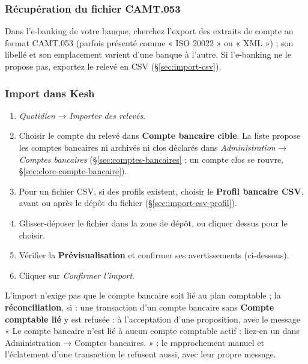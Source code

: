 \documentclass[a4paper,11pt,oneside]{article}
\begin{document}
\subsubsection{Récupération du fichier CAMT.053}

\begin{sloppypar}
Dans l'e-banking de votre banque, cherchez l'export des extraits de compte au format CAMT.053
(parfois présenté comme « ISO 20022 » ou « XML ») ; son libellé et son emplacement varient d'une
banque à l'autre. Si l'e-banking ne le propose pas, exportez le relevé en CSV
(\S\ref{sec:import-csv}).
\end{sloppypar}

\subsubsection{Import dans Kesh}\label{sec:import-dans-kesh}

\begin{enumerate}
    \item \emph{Quotidien} → \emph{Importer des relevés}.
    \item Choisir le compte du relevé dans \textbf{Compte bancaire cible}. La liste propose les
    comptes bancaires ni archivés ni clos déclarés dans \emph{Administration} → \emph{Comptes
    bancaires} (\S\ref{sec:comptes-bancaires} ; un compte clos se rouvre,
    \S\ref{sec:clore-compte-bancaire}).
    \item Pour un fichier CSV, si des profils existent, choisir le \textbf{Profil bancaire CSV},
    avant ou après le dépôt du fichier (\S\ref{sec:import-csv-profil}).
    \item Glisser-déposer le fichier dans la zone de dépôt, ou cliquer dessus pour le choisir.
    \item Vérifier la \textbf{Prévisualisation} et confirmer ses avertissements (ci-dessous).
    \item Cliquer sur \emph{Confirmer l'import}.
\end{enumerate}

L'import n'exige pas que le compte bancaire soit lié au plan comptable ; la
\textbf{réconciliation}, si : une transaction d'un compte bancaire sans \textbf{Compte comptable
lié} y est refusée : à l'acceptation d'une proposition, avec le message « Le compte bancaire n’est
lié à aucun compte comptable actif : liez-en un dans Administration → Comptes bancaires. » ; le
rapprochement manuel et l'éclatement d'une transaction le refusent aussi, avec leur propre message.
\end{document}
